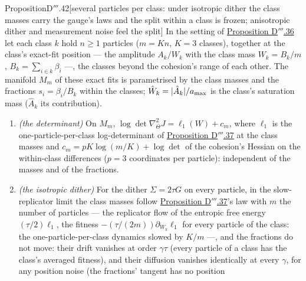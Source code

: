 \begin{thm}{Proposition}{D$'''$.42}[several particles per class: under isotropic dither the class masses carry the
gauge's laws and the split within a class is frozen; anisotropic dither and measurement noise feel the
split]\label{res:thmDppp:42}%
In the setting of \hyperref[res:thmDppp:36]{Proposition D$'''$.36} let each class $k$ hold $n\ge1$ particles
($m = Kn$, $K = 3$ classes), together at the class's exact-fit position --- the amplitude $A_k/W_k$ with the class mass
$W_k = B_k/m$, $B_k = \sum_{i\in k}\beta_i$ ---, the classes beyond the cohesion's range of each other. The manifold
$M_m$ of these exact fits is parametrised by the class masses and the fractions $s_i = \beta_i/B_k$ within the classes;
$\hat W_k = \lvert \hat A_k\rvert/a_{\max}$ is the class's saturation mass ($\hat A_k$ its contribution).
\begin{enumerate}[label=\textup{(\roman*)}]
  \item \emph{(the determinant)} On $M_m$, $\log\det\nabla^2_\Theta J = \ell_1(W) + c_m$, where $\ell_1$ is the
    one-particle-per-class log-determinant of \hyperref[res:thmDppp:37]{Proposition D$'''$.37} at the class masses and
    $c_m = pK\log(m/K) + \log\det$ of the cohesion's Hessian on the within-class differences ($p = 3$ coordinates per
    particle): independent of the masses and of the fractions.
  \item \emph{(the isotropic dither)} For the dither $\Sigma = 2\tau G$ on every particle, in the slow-replicator limit
    the class masses follow \hyperref[res:thmDppp:37]{Proposition D$'''$.37}'s law with $m$ the number of particles ---
    the replicator flow of the entropic free energy $(\tau/2)\ell_1$, the fitness $-(\tau/(2m))\partial_{W_k}\ell_1$ for
    every particle of the class: the one-particle-per-class dynamics slowed by $K/m$ ---, and the fractions do not move:
    their drift vanishes at order $\gamma\tau$ (every particle of a class has the class's averaged fitness), and their
    diffusion vanishes identically at every $\gamma$, for any position noise (the fractions' tangent has no position

\end{enumerate}
\end{thm}
